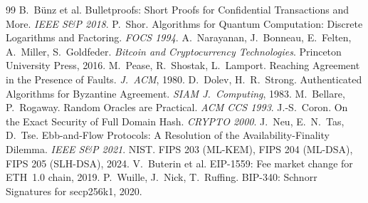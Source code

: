 \documentclass[11pt,a4paper]{article}
\theoremstyle{definition}
\theoremstyle{plain}
\theoremstyle{remark}
\begin{document}
\begin{thebibliography}{99}
 B.~B\"unz et al. Bulletproofs: Short Proofs for Confidential Transactions and More. \emph{IEEE S\&P 2018}.
 P.~Shor. Algorithms for Quantum Computation: Discrete Logarithms and Factoring. \emph{FOCS 1994}.
 A.~Narayanan, J.~Bonneau, E.~Felten, A.~Miller, S.~Goldfeder. \emph{Bitcoin and Cryptocurrency Technologies}. Princeton University Press, 2016.
 M.~Pease, R.~Shostak, L.~Lamport. Reaching Agreement in the Presence of Faults. \emph{J.\ ACM}, 1980.
 D.~Dolev, H.~R.~Strong. Authenticated Algorithms for Byzantine Agreement. \emph{SIAM J.\ Computing}, 1983.
 M.~Bellare, P.~Rogaway. Random Oracles are Practical. \emph{ACM CCS 1993}.
 J.-S.~Coron. On the Exact Security of Full Domain Hash. \emph{CRYPTO 2000}.
 J.~Neu, E.~N.~Tas, D.~Tse. Ebb-and-Flow Protocols: A Resolution of the Availability-Finality Dilemma. \emph{IEEE S\&P 2021}.
 NIST. FIPS 203 (ML-KEM), FIPS 204 (ML-DSA), FIPS 205 (SLH-DSA), 2024.
 V.~Buterin et al. EIP-1559: Fee market change for ETH~1.0 chain, 2019.
 P.~Wuille, J.~Nick, T.~Ruffing. BIP-340: Schnorr Signatures for secp256k1, 2020.
\end{thebibliography}
\end{document}
